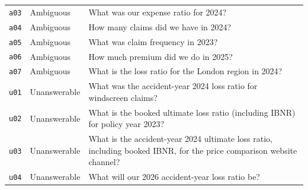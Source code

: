 {\begin{longtable}{p{0.6cm}p{2.2cm}p{11.5cm}}
\texttt{a03} & Ambiguous & What was our expense ratio for 2024? \\
\texttt{a04} & Ambiguous & How many claims did we have in 2024? \\
\texttt{a05} & Ambiguous & What was claim frequency in 2023? \\
\texttt{a06} & Ambiguous & How much premium did we do in 2025? \\
\texttt{a07} & Ambiguous & What is the loss ratio for the London region in 2024? \\
\texttt{u01} & Unanswerable & What was the accident-year 2024 loss ratio for windscreen claims? \\
\texttt{u02} & Unanswerable & What is the booked ultimate loss ratio (including IBNR) for policy year 2023? \\
\texttt{u03} & Unanswerable & What is the accident-year 2024 ultimate loss ratio, including booked IBNR, for the price comparison website channel? \\
\texttt{u04} & Unanswerable & What will our 2026 accident-year loss ratio be? \\
\bottomrule\end{longtable}}
